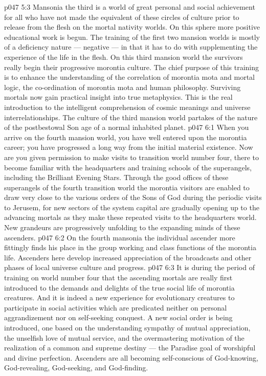 \vs p047 5:3 Mansonia the third is a world of great personal and social achievement for all who have not made the equivalent of these circles of culture prior to release from the flesh on the mortal nativity worlds. On this sphere more positive educational work is begun. The training of the first two mansion worlds is mostly of a deficiency nature --- negative --- in that it has to do with supplementing the experience of the life in the flesh. On this third mansion world the survivors really begin their progressive morontia culture. The chief purpose of this training is to enhance the understanding of the correlation of morontia mota and mortal logic, the co\hyp{}ordination of morontia mota and human philosophy. Surviving mortals now gain practical insight into true metaphysics. This is the real introduction to the intelligent comprehension of cosmic meanings and universe interrelationships. The culture of the third mansion world partakes of the nature of the postbestowal Son age of a normal inhabited planet.
\vs p047 6:1 When you arrive on the fourth mansion world, you have well entered upon the morontia career; you have progressed a long way from the initial material existence. Now are you given permission to make visits to transition world number four, there to become familiar with the headquarters and training schools of the superangels, including the Brilliant Evening Stars. Through the good offices of these superangels of the fourth transition world the morontia visitors are enabled to draw very close to the various orders of the Sons of God during the periodic visits to Jerusem, for new sectors of the system capital are gradually opening up to the advancing mortals as they make these repeated visits to the headquarters world. New grandeurs are progressively unfolding to the expanding minds of these ascenders.
\vs p047 6:2 On the fourth mansonia the individual ascender more fittingly finds his place in the group working and class functions of the morontia life. Ascenders here develop increased appreciation of the broadcasts and other phases of local universe culture and progress.
\vs p047 6:3 It is during the period of training on world number four that the ascending mortals are really first introduced to the demands and delights of the true social life of morontia creatures. And it is indeed a new experience for evolutionary creatures to participate in social activities which are predicated neither on personal aggrandizement nor on self\hyp{}seeking conquest. A new social order is being introduced, one based on the understanding sympathy of mutual appreciation, the unselfish love of mutual service, and the overmastering motivation of the realization of a common and supreme destiny --- the Paradise goal of worshipful and divine perfection. Ascenders are all becoming self\hyp{}conscious of God\hyp{}knowing, God\hyp{}revealing, God\hyp{}seeking, and God\hyp{}finding.
